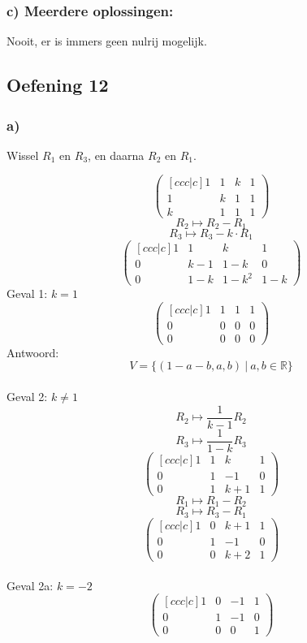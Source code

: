 \documentclass[lineaire_algebra_oplossingen.tex]{subfiles}
\begin{document}
\subsubsection*{c) Meerdere oplossingen:}
Nooit, er is immers geen nulrij mogelijk.

\subsection{Oefening 12}
\subsubsection*{a)}
\begin{center}
Wissel $R_1$ en $R_3$, en daarna $R_2$ en $R_1$.
\end{center}
\[
\begin{pmatrix}[ccc|c]
1 &  1 &  k & 1\\
1 &  k &  1 & 1\\
k &  1 &  1 & 1
\end{pmatrix}
\]
\[ R_2 \longmapsto R_2 - R_1\]
\[ R_3 \longmapsto R_3 - k \cdot	R_1\]
\[
\begin{pmatrix}[ccc|c]
1 &  1 &  k & 1\\
0 & k-1& 1-k& 0\\
0 & 1-k & 1-k^2 & 1-k
\end{pmatrix}
\]
Geval 1: $k=1$
\[
\begin{pmatrix}[ccc|c]
1 &  1 & 1 & 1\\
0 &  0 & 0 & 0\\
0 &  0 & 0 & 0
\end{pmatrix}
\]
Antwoord:
\[
V=\{ (1-a-b,a,b)\ |\ a,b \in \mathbb{R}\}
\]\\
Geval 2: $k\neq 1$\\ 
\[ R_2 \longmapsto \frac{1}{k-1}R_2\]
\[ R_3 \longmapsto \frac{1}{1-k}R_3\]
\[
\begin{pmatrix}[ccc|c]
1 &  1 &  k & 1\\
0 &  1 & -1 & 0\\
0 &  1 & k+1& 1
\end{pmatrix}
\]
\[ R_1 \longmapsto R_1-R_2\]
\[ R_3 \longmapsto R_3-R_1\]
\[
\begin{pmatrix}[ccc|c]
1 &  0 &  k+1 & 1\\
0 &  1 & -1 & 0\\
0 &  0 & k+2& 1
\end{pmatrix}
\]\\
Geval 2a: $k = -2$\\
\[
\begin{pmatrix}[ccc|c]
1 &  0 & -1 & 1\\
0 &  1 & -1 & 0\\
0 &  0 &  0 & 1
\end{pmatrix}
\]
\end{document}
